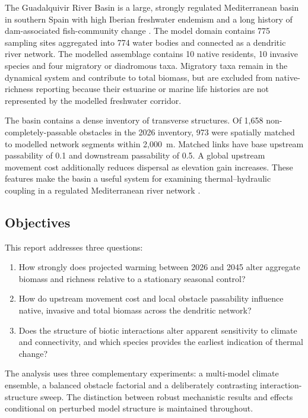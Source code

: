 \documentclass[11pt,a4paper]{article}
\begin{document}
The Guadalquivir River Basin is a large, strongly regulated Mediterranean basin in southern Spain with high Iberian freshwater endemism and a long history of dam-associated fish-community change \cite{Herrera2022,RamosMerchante2018}. The model domain contains 775 sampling sites aggregated into 774 water bodies and connected as a dendritic river network. The modelled assemblage contains 10 native residents, 10 invasive species and four migratory or diadromous taxa. Migratory taxa remain in the dynamical system and contribute to total biomass, but are excluded from native-richness reporting because their estuarine or marine life histories are not represented by the modelled freshwater corridor.

The basin contains a dense inventory of transverse structures. Of 1,658 non-completely-passable obstacles in the 2026 inventory, 973 were spatially matched to modelled network segments within 2,000~m. Matched links have base upstream passability of 0.1 and downstream passability of 0.5. A global upstream movement cost additionally reduces dispersal as elevation gain increases. These features make the basin a useful system for examining thermal--hydraulic coupling in a regulated Mediterranean river network \cite{PerkinGido2012,Larsenetal2021}.

\subsection{Objectives}

This report addresses three questions:

\begin{enumerate}
    \item How strongly does projected warming between 2026 and 2045 alter aggregate biomass and richness relative to a stationary seasonal control?
    \item How do upstream movement cost and local obstacle passability influence native, invasive and total biomass across the dendritic network?
    \item Does the structure of biotic interactions alter apparent sensitivity to climate and connectivity, and which species provides the earliest indication of thermal change?
\end{enumerate}

The analysis uses three complementary experiments: a multi-model climate ensemble, a balanced obstacle factorial and a deliberately contrasting interaction-structure sweep. The distinction between robust mechanistic results and effects conditional on perturbed model structure is maintained throughout.
\end{document}
